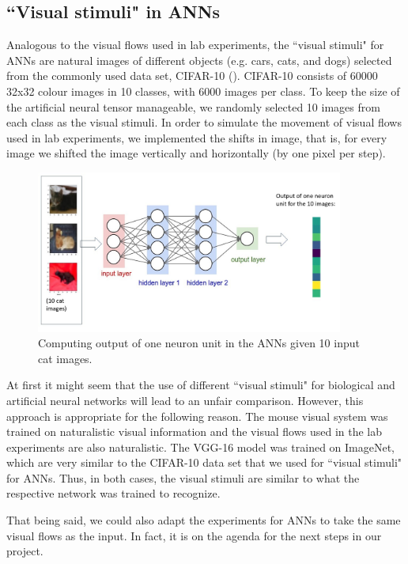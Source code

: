 \subsection{``Visual stimuli" in ANNs}
Analogous to the visual flows used in lab experiments, the ``visual stimuli" for ANNs are natural images of different objects (e.g. cars, cats, and dogs) selected from the commonly used data set, CIFAR-10 (\cite{Krizhevsky09cifar-10}). CIFAR-10 consists of 60000 32x32 colour images in 10 classes, with 6000 images per class. To keep the size of the artificial neural tensor manageable, we randomly selected 10 images from each class as the visual stimuli. In order to simulate the movement of visual flows used in lab experiments, we implemented the shifts in image, that is, for every image we shifted the image vertically and horizontally (by one pixel per step). 
    \begin{figure}[H]
        \centering
            \includegraphics[width=0.9\textwidth]{presentation/Slide1.jpg}
            \caption{Computing output of one neuron unit in the ANNs given 10 input cat images.}
    \end{figure}

\begin{rmk}
At first it might seem that the use of different ``visual stimuli" for biological and artificial neural networks will lead to an unfair comparison. However, this approach is appropriate for the following reason. The mouse visual system was trained on naturalistic visual information and the visual flows used in the lab experiments are also naturalistic. The VGG-16 model was trained on ImageNet, which are very similar to the CIFAR-10 data set that we used for ``visual stimuli" for ANNs. Thus, in both cases, the visual stimuli are similar to what the respective network was trained to recognize.

That being said, we could also adapt the experiments for ANNs to take the same visual flows as the input. In fact, it is on the agenda for the next steps in our project.
\end{rmk}
 
